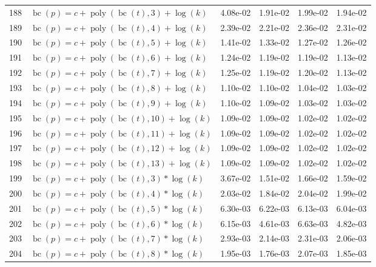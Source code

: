 \documentclass[12pt,a4paper]{article}
\DeclareMathOperator{\bc}{bc}
\DeclareMathOperator{\poly}{poly}
\begin{document}
\begin{longtable}[t]{ll>{\raggedleft\arraybackslash}p{2cm}>{\raggedleft\arraybackslash}p{2cm}>{\raggedleft\arraybackslash}p{2cm}>{\raggedleft\arraybackslash}p{2cm}}
188 & $\bc(p) = c + \poly\left( \bc(t), 3 \right) + \log(k)$ & 4.08e-02 & 1.91e-02 & 1.99e-02 & 1.94e-02\\
\rowcolor{gray!6}  189 & $\bc(p) = c + \poly\left( \bc(t), 4 \right) + \log(k)$ & 2.39e-02 & 2.21e-02 & 2.36e-02 & 2.31e-02\\
190 & $\bc(p) = c + \poly\left( \bc(t), 5 \right) + \log(k)$ & 1.41e-02 & 1.33e-02 & 1.27e-02 & 1.26e-02\\
\rowcolor{gray!6}  191 & $\bc(p) = c + \poly\left( \bc(t), 6 \right) + \log(k)$ & 1.24e-02 & 1.19e-02 & 1.19e-02 & 1.13e-02\\
192 & $\bc(p) = c + \poly\left( \bc(t), 7 \right) + \log(k)$ & 1.25e-02 & 1.19e-02 & 1.20e-02 & 1.13e-02\\
\rowcolor{gray!6}  193 & $\bc(p) = c + \poly\left( \bc(t), 8 \right) + \log(k)$ & 1.10e-02 & 1.10e-02 & 1.04e-02 & 1.03e-02\\
194 & $\bc(p) = c + \poly\left( \bc(t), 9 \right) + \log(k)$ & 1.10e-02 & 1.09e-02 & 1.03e-02 & 1.03e-02\\
\rowcolor{gray!6}  195 & $\bc(p) = c + \poly\left( \bc(t), 10 \right) + \log(k)$ & 1.09e-02 & 1.09e-02 & 1.02e-02 & 1.02e-02\\
196 & $\bc(p) = c + \poly\left( \bc(t), 11 \right) + \log(k)$ & 1.09e-02 & 1.09e-02 & 1.02e-02 & 1.02e-02\\
\rowcolor{gray!6}  197 & $\bc(p) = c + \poly\left( \bc(t), 12 \right) + \log(k)$ & 1.09e-02 & 1.09e-02 & 1.02e-02 & 1.02e-02\\
198 & $\bc(p) = c + \poly\left( \bc(t), 13 \right) + \log(k)$ & 1.09e-02 & 1.09e-02 & 1.02e-02 & 1.02e-02\\
\rowcolor{gray!6}  199 & $\bc(p) = c + \poly\left( \bc(t), 3 \right) * \log(k)$ & 3.67e-02 & 1.51e-02 & 1.66e-02 & 1.59e-02\\
200 & $\bc(p) = c + \poly\left( \bc(t), 4 \right) * \log(k)$ & 2.03e-02 & 1.84e-02 & 2.04e-02 & 1.99e-02\\
\rowcolor{gray!6}  201 & $\bc(p) = c + \poly\left( \bc(t), 5 \right) * \log(k)$ & 6.30e-03 & 6.22e-03 & 6.13e-03 & 6.04e-03\\
202 & $\bc(p) = c + \poly\left( \bc(t), 6 \right) * \log(k)$ & 6.15e-03 & 4.61e-03 & 6.63e-03 & 4.82e-03\\
\rowcolor{gray!6}  203 & $\bc(p) = c + \poly\left( \bc(t), 7 \right) * \log(k)$ & 2.93e-03 & 2.14e-03 & 2.31e-03 & 2.06e-03\\
204 & $\bc(p) = c + \poly\left( \bc(t), 8 \right) * \log(k)$ & 1.95e-03 & 1.76e-03 & 2.07e-03 & 1.85e-03\\

\end{longtable}
\end{document}
